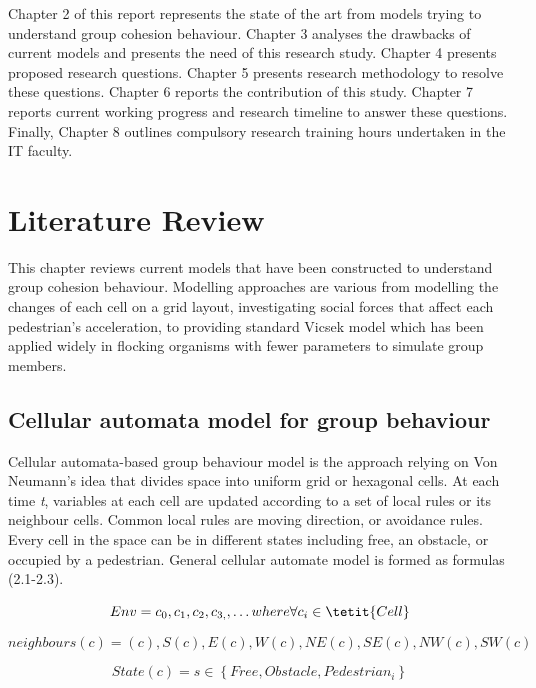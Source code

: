 \documentclass[a4paper,11pt,phdthesis,singlespace,twoside]{cssethesis}
\begin{document}
Chapter 2 of this report represents the state of the art from models trying to understand group cohesion behaviour. Chapter 3 analyses the drawbacks of current models and presents the need of this research study. Chapter 4 presents proposed research questions. Chapter 5 presents research methodology to resolve these questions. Chapter 6 reports the contribution of this study. Chapter 7 reports current working progress and research timeline to answer these questions. Finally, Chapter 8 outlines compulsory research training hours undertaken in the IT faculty.

\chapter{Literature Review}

This chapter reviews current models that have been constructed to understand group cohesion behaviour. Modelling approaches are various from modelling the changes of each cell on a grid layout, investigating social forces that affect each pedestrian’s acceleration, to providing standard Vicsek model which has been applied widely in flocking organisms with fewer parameters to simulate group members.

\section{Cellular automata model for group behaviour}
Cellular automata-based group behaviour model is the approach relying on Von Neumann's idea that divides space into uniform grid or hexagonal cells. At each time \textit{t}, variables at each cell are updated according to a set of local rules or its neighbour cells. Common local rules are moving direction, or avoidance rules. Every cell in the space can be in different states including free, an obstacle, or occupied by a pedestrian. General cellular automate model is formed as formulas (2.1-2.3).

\begin{equation}
Env = c_{0},c_{1},c_{2},c_{3,},\ldots where\/ \forall c_{i} \in \tetit{Cell}
\end{equation}

\begin{equation}
neighbours(c) = {(c),S(c),E(c),W(c),NE(c),SE (c),NW(c),SW(c)}
\end{equation}

\begin{equation}
State(c)= s \in \left \{Free,Obstacle,Pedestrian_{i}\right \}
\end{equation}
\end{document}
